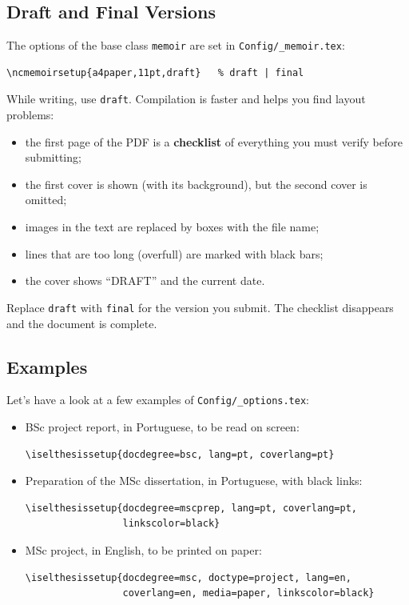 \subsection{Draft and Final Versions} %
\label{ssec:draft_final}

The options of the base class \texttt{memoir} are set in \texttt{Config/\_memoir.tex}:

\begin{Verbatim}[breaklines=true, breakanywhere=true]
\ncmemoirsetup{a4paper,11pt,draft}   % draft | final
\end{Verbatim}

While writing, use \texttt{draft}. Compilation is faster and helps you find layout problems:
\begin{itemize}
	\item the first page of the PDF is a \textbf{checklist} of everything you must verify before submitting;
	\item the first cover is shown (with its background), but the second cover is omitted;
	\item images in the text are replaced by boxes with the file name;
	\item lines that are too long (overfull) are marked with black bars;
	\item the cover shows ``DRAFT'' and the current date.
\end{itemize}

Replace \texttt{draft} with \texttt{final} for the version you submit. The checklist disappears and the document is complete.

\subsection{Examples} %
\label{ssec:examples}

Let's have a look at a few examples of \texttt{Config/\_options.tex}:

\begin{itemize}
	\item BSc project report, in Portuguese, to be read on screen:
\begin{Verbatim}
\iselthesissetup{docdegree=bsc, lang=pt, coverlang=pt}
\end{Verbatim}
	\item Preparation of the MSc dissertation, in Portuguese, with black links:
\begin{Verbatim}
\iselthesissetup{docdegree=mscprep, lang=pt, coverlang=pt,
                 linkscolor=black}
\end{Verbatim}
	\item MSc project, in English, to be printed on paper:
\begin{Verbatim}
\iselthesissetup{docdegree=msc, doctype=project, lang=en,
                 coverlang=en, media=paper, linkscolor=black}
\end{Verbatim}
\end{itemize}

